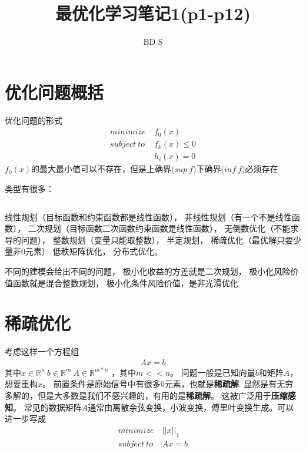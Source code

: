 \documentclass{article}
\title{最优化学习笔记1(p1-p12)}
\author{BD S}
\begin{document}
\maketitle
\tableofcontents
\section{优化问题概括}
优化问题的形式
\begin{equation}
    \begin{aligned}
        minimize \ &f_0(x)        \\
        subject \ to \ &f_k(x) \le 0 \\
        &h_i(x) = 0
    \end{aligned}
\end{equation}
$f_0(x)$的最大最小值可以不存在，但是上确界($sup \ f $)下确界($inf \ f $)必须存在

类型有很多：
\begin{tabular}{|l|l|l|l|}
    
\end{tabular}
线性规划（目标函数和约束函数都是线性函数），
非线性规划（有一个不是线性函数），
二次规划（目标函数二次函数约束函数是线性函数），
无倒数优化（不能求导的问题），
整数规划（变量只能取整数），
半定规划，
稀疏优化（最优解只要少量非0元素）
低秩矩阵优化，
分布式优化。

不同的建模会给出不同的问题，
极小化收益的方差就是二次规划，
极小化风险价值函数就是混合整数规划，
极小化条件风险价值，是非光滑优化
\section{稀疏优化}
考虑这样一个方程组
\begin{equation}
    \begin{aligned}
        Ax=b
    \end{aligned}
\end{equation}
其中$x \in \mathbb{R}^n \ b \in \mathbb{R}^m \  A \in \mathbb{R}^{m*n} $
，其中$m<<n$。
问题一般是已知向量$b$和矩阵$A$，想要重构$x$。
前置条件是原始信号中有很多0元素，也就是\textbf{稀疏解}.
显然是有无穷多解的，但是大多数是我们不感兴趣的，有用的是\textbf{稀疏解}。
这被广泛用于\textbf{压缩感知}。
常见的数据矩阵$A$通常由离散余弦变换，小波变换，傅里叶变换生成。可以进一步写成
\begin{equation}
    \begin{aligned}
        minimize \  &||x||_1 \\
        subject \ to \ &Ax=b
    \end{aligned}
\end{equation}
\end{document}
